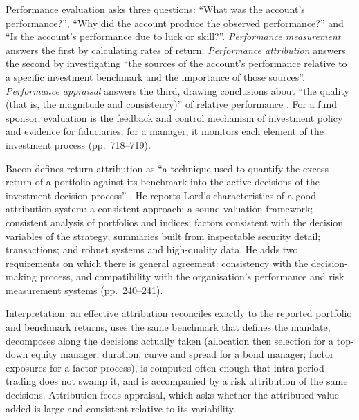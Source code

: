 \begin{qfdefinition}\label{def:performance-evaluation-components}
 Performance evaluation asks three questions: ``What was the account's performance?'', ``Why did the account produce the observed performance?'' and ``Is the account's performance due to luck or skill?''. \emph{Performance measurement} answers the first by calculating rates of return. \emph{Performance attribution} answers the second by investigating ``the sources of the account's performance relative to a specific investment benchmark and the importance of those sources''. \emph{Performance appraisal} answers the third, drawing conclusions about ``the quality (that is, the magnitude and consistency)'' of relative performance \citep[chap.~12 (Bailey, Richards and Tierney), pp.~719--720]{managing-investment-portfolios-2007}. For a fund sponsor, evaluation is the feedback and control mechanism of investment policy and evidence for fiduciaries; for a manager, it monitors each element of the investment process (pp.~718--719).

Bacon defines return attribution as ``a technique used to quantify the excess return of a portfolio against its benchmark into the active decisions of the investment decision process'' \citep[3rd ed., 2023, chap.~6, p.~239]{wide-bacon-attribution}. He reports Lord's characteristics of a good attribution system: a consistent approach; a sound valuation framework; consistent analysis of portfolios and indices; factors consistent with the decision variables of the strategy; summaries built from inspectable security detail; transactions; and robust systems and high-quality data. He adds two requirements on which there is general agreement: consistency with the decision-making process, and compatibility with the organisation's performance and risk measurement systems (pp.~240--241).

 Interpretation: an effective attribution reconciles exactly to the reported portfolio and benchmark returns, uses the same benchmark that defines the mandate, decomposes along the decisions actually taken (allocation then selection for a top-down equity manager; duration, curve and spread for a bond manager; factor exposures for a factor process), is computed often enough that intra-period trading does not swamp it, and is accompanied by a risk attribution of the same decisions. Attribution feeds appraisal, which asks whether the attributed value added is large and consistent relative to its variability.


\end{qfdefinition}

